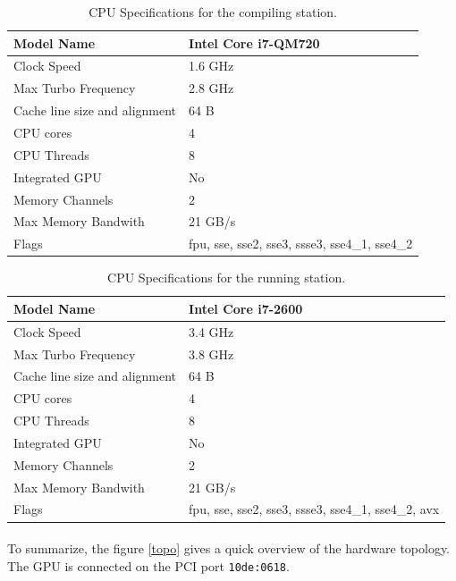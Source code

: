 \documentclass[fleqn,11pt]{SelfArx} %
\begin{document}
\begin{table}[!h]
	\centering

	\begin{tabular}{|p{3.5cm}|p{4cm}|}
		\hline
		Model Name & Intel Core i7-QM720 \\
		\hline
		Clock Speed & 1.6 GHz \\
		\hline
		Max Turbo Frequency & 2.8 GHz \\
		\hline
		Cache line size and alignment & 64 B \\
		\hline
		CPU cores & 4 \\
		\hline
		CPU Threads & 8 \\
		\hline
		Integrated GPU & No \\
		\hline
		Memory Channels & 2 \\
		\hline
		Max Memory Bandwith & 21 GB/s \\
		\hline
		Flags & fpu, sse, sse2, sse3, ssse3, sse4\_1, sse4\_2 \\
		\hline
	\end{tabular}

	\caption{CPU Specifications for the compiling station.}
	\label{CPUspecC}
\end{table}

\begin{table}[!h]
	\centering

	\begin{tabular}{|p{3.5cm}|p{4cm}|}
		\hline
		Model Name & Intel Core i7-2600 \\
		\hline
		Clock Speed & 3.4 GHz \\
		\hline
		Max Turbo Frequency & 3.8 GHz \\
		\hline
		Cache line size and alignment & 64 B \\
		\hline
		CPU cores & 4 \\
		\hline
		CPU Threads & 8 \\
		\hline
		Integrated GPU & No \\
		\hline
		Memory Channels & 2 \\
		\hline
		Max Memory Bandwith & 21 GB/s \\
		\hline
		Flags & fpu, sse, sse2, sse3, ssse3, sse4\_1, sse4\_2, avx \\
		\hline
	\end{tabular}

	\caption{CPU Specifications for the running station.}
	\label{CPUspecR}
\end{table}

\paragraph{}
To summarize, the figure \ref{topo} gives a quick overview of the hardware topology. The GPU is connected on the PCI port \verb+10de:0618+.
\end{document}
